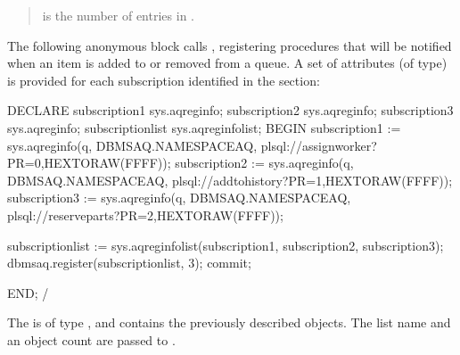 \documentclass[letterpaper,10pt,english,openany,oneside]{sphinxmanual}
\begin{document}
\begin{quote}

 is the number of entries in .
\end{quote}


The following anonymous block calls , registering
procedures that will be notified when an item is added to or removed
from a queue. A set of attributes (of  type) is
provided for each subscription identified in the  section:

%
\begin{sphinxVerbatim}[commandchars=\\\{\}]
DECLARE
   subscription1 sys.aq\PYGZdl{}\PYGZus{}reg\PYGZus{}info;
   subscription2 sys.aq\PYGZdl{}\PYGZus{}reg\PYGZus{}info;
   subscription3 sys.aq\PYGZdl{}\PYGZus{}reg\PYGZus{}info;
   subscriptionlist sys.aq\PYGZdl{}\PYGZus{}reg\PYGZus{}info\PYGZus{}list;
BEGIN
  subscription1 := sys.aq\PYGZdl{}\PYGZus{}reg\PYGZus{}info(\PYGZsq{}q\PYGZsq{}, DBMS\PYGZus{}AQ.NAMESPACE\PYGZus{}AQ,
\PYGZsq{}plsql://assign\PYGZus{}worker?PR=0\PYGZsq{},HEXTORAW(\PYGZsq{}FFFF\PYGZsq{}));
  subscription2 := sys.aq\PYGZdl{}\PYGZus{}reg\PYGZus{}info(\PYGZsq{}q\PYGZsq{}, DBMS\PYGZus{}AQ.NAMESPACE\PYGZus{}AQ,
\PYGZsq{}plsql://add\PYGZus{}to\PYGZus{}history?PR=1\PYGZsq{},HEXTORAW(\PYGZsq{}FFFF\PYGZsq{}));
  subscription3 := sys.aq\PYGZdl{}\PYGZus{}reg\PYGZus{}info(\PYGZsq{}q\PYGZsq{}, DBMS\PYGZus{}AQ.NAMESPACE\PYGZus{}AQ,
\PYGZsq{}plsql://reserve\PYGZus{}parts?PR=2\PYGZsq{},HEXTORAW(\PYGZsq{}FFFF\PYGZsq{}));

  subscriptionlist := sys.aq\PYGZdl{}\PYGZus{}reg\PYGZus{}info\PYGZus{}list(subscription1,
subscription2, subscription3);
  dbms\PYGZus{}aq.register(subscriptionlist, 3);
commit;

   END;
    /
\end{sphinxVerbatim}

The  is of type , and contains
the previously described  objects. The list name and
an object count are passed to .

\newpage
\end{document}

